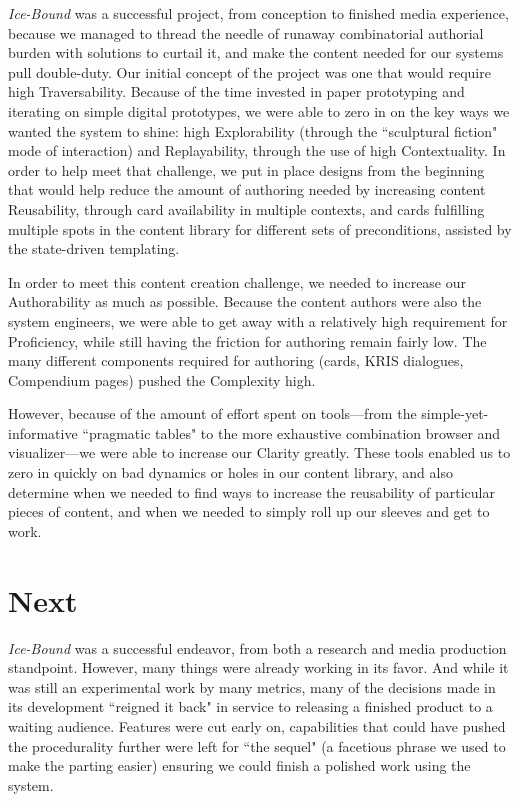 \textit{Ice-Bound} was a successful project, from conception to finished media experience, because we managed to thread the needle of runaway combinatorial authorial burden with solutions to curtail it, and make the content needed for our systems pull double-duty. Our initial concept of the project was one that would require high Traversability. Because of the time invested in paper prototyping and iterating on simple digital prototypes, we were able to zero in on the key ways we wanted the system to shine: high Explorability (through the ``sculptural fiction" mode of interaction) and Replayability, through the use of high Contextuality. In order to help meet that challenge, we put in place designs from the beginning that would help reduce the amount of authoring needed by increasing content Reusability, through card availability in multiple contexts, and cards fulfilling multiple spots in the content library for different sets of preconditions, assisted by the state-driven templating.

In order to meet this content creation challenge, we needed to increase our Authorability as much as possible. Because the content authors were also the system engineers, we were able to get away with a relatively high requirement for Proficiency, while still having the friction for authoring remain fairly low. The many different components required for authoring (cards, KRIS dialogues, Compendium pages) pushed the Complexity high.

However, because of the amount of effort spent on tools---from the simple-yet-informative ``pragmatic tables" to the more exhaustive combination browser and visualizer---we were able to increase our Clarity greatly. These tools enabled us to zero in quickly on bad dynamics or holes in our content library, and also determine when we needed to find ways to increase the reusability of particular pieces of content, and when we needed to simply roll up our sleeves and get to work.

\section{Next}\label{sec:icebound-next}

\textit{Ice-Bound} was a successful endeavor, from both a research and media production standpoint. However, many things were already working in its favor. And while it was still an experimental work by many metrics, many of the decisions made in its development ``reigned it back" in service to releasing a finished product to a waiting audience. Features were cut early on, capabilities that could have pushed the procedurality further were left for ``the sequel" (a facetious phrase we used to make the parting easier) ensuring we could finish a polished work using the system.

